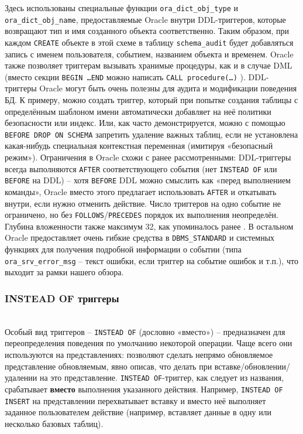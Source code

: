 Здесь использованы специальные функции \texttt{ora\_dict\_obj\_type} и \texttt{ora\_dict\_obj\_name}, предоставляемые Oracle внутри DDL-триггеров, которые возвращают тип и имя созданного объекта соответственно. Таким образом, при каждом \texttt{CREATE} объекте в этой схеме в таблицу \texttt{schema\_audit} будет добавляться запись с именем пользователя, событием, названием объекта и временем. Oracle также позволяет триггерам вызывать хранимые процедуры, как и в случае DML (вместо секции \texttt{BEGIN \ldots END} можно написать \texttt{CALL procedure(\ldots)} \autocite{oracledbdoc7}).
DDL-триггеры Oracle могут быть очень полезны для аудита и модификации поведения БД. К примеру, можно создать триггер, который при попытке создания таблицы с определённым шаблоном имени автоматически добавляет на неё политики безопасности или индекс. Или, как часто демонстрируется, можно с помощью \texttt{BEFORE DROP ON SCHEMA} запретить удаление важных таблиц, если не установлена какая-нибудь специальная контекстная переменная (имитируя «безопасный режим»).
Ограничения в Oracle схожи с ранее рассмотренными: DDL-триггеры всегда выполняются \texttt{AFTER} соответствующего события (нет \texttt{INSTEAD OF} или \texttt{BEFORE} на DDL) – хотя \texttt{BEFORE} DDL можно смыслить как «перед выполнением команды», Oracle вместо этого предлагает использовать \texttt{AFTER} и откатывать внутри, если нужно отменить действие. Число триггеров на одно событие не ограничено, но без \texttt{FOLLOWS}/\texttt{PRECEDES} порядок их выполнения неопределён. Глубина вложенности также максимум 32, как упоминалось ранее \autocite{oracledbdoc8}. 
В остальном Oracle предоставляет очень гибкие средства в \texttt{DBMS\_STANDARD} и системных функциях для получения подробной информации о событии (типа \texttt{ora\_srv\_error\_msg} – текст ошибки, если триггер на событие ошибок и т.п.), что выходит за рамки нашего обзора.

\subsubsection{INSTEAD OF триггеры} ~\\
Особый вид триггеров – \texttt{INSTEAD OF} (дословно «вместо») – предназначен для переопределения поведения по умолчанию некоторой операции. Чаще всего они используются на представлениях: позволяют сделать непрямо обновляемое представление обновляемым, явно описав, что делать при вставке/обновлении/удалении на это представление. \texttt{INSTEAD OF}-триггер, как следует из названия, срабатывает \textbf{вместо} выполнения указанного действия.
Например, \texttt{INSTEAD OF INSERT} на представлении перехватывает вставку и вместо неё выполняет заданное пользователем действие (например, вставляет данные в одну или несколько базовых таблиц).

